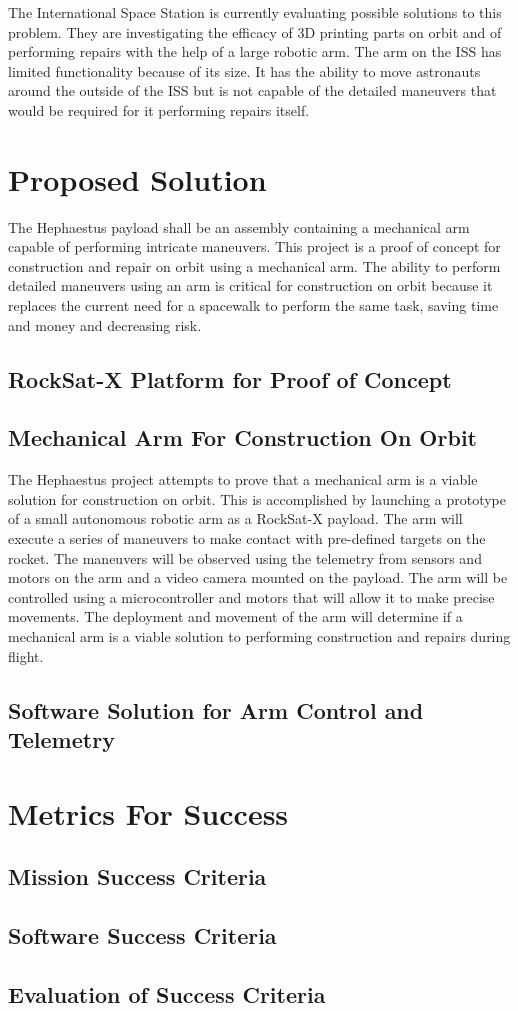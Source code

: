 \documentclass[letterpaper,10pt]{article}
\begin{document}
The International Space Station is currently evaluating possible solutions to this problem. They are 
investigating the efficacy of 3D printing parts on orbit and of performing repairs with the help of 
a large robotic arm. The arm on the ISS has limited functionality because of its size.
 It has the ability to move astronauts around the outside of the ISS but is not capable of the detailed maneuvers that would be required for it performing repairs itself.


\section{Proposed Solution}
The Hephaestus payload shall be an assembly containing a mechanical arm capable of performing intricate maneuvers.
This project is a proof of concept for construction and repair on orbit using a mechanical arm. 
The ability to perform detailed maneuvers using an arm is critical for construction on orbit because
it replaces the current need for a spacewalk to perform the same task, saving time and money and decreasing risk.

\subsection{RockSat-X Platform for Proof of Concept}
\subsection{Mechanical Arm For Construction On Orbit}
The Hephaestus project attempts to prove that a mechanical arm is a viable solution for construction on orbit.
This is accomplished by launching a prototype of a small autonomous robotic arm as a RockSat-X payload.
The arm will execute a series of maneuvers to make contact with pre-defined targets on the rocket.
The maneuvers will be observed using the telemetry from sensors and motors on the arm and a video camera mounted on the payload.
The arm will be controlled using a microcontroller and motors that will allow it to make precise movements.
The deployment and movement of the arm will determine if a mechanical arm is a viable solution to performing construction and repairs during flight.
\subsection{Software Solution for Arm Control and Telemetry}

\section{Metrics For Success}
\subsection{Mission Success Criteria}
\subsection{Software Success Criteria}
\subsection{Evaluation of Success Criteria}
\end{document}
